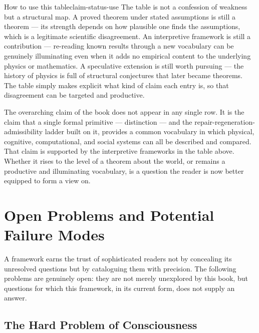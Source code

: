\documentclass[12pt,twoside,openright]{book}
\begin{document}
\begin{remark}{How to use this table}{claim-status-use}
  The table is not a confession of weakness but a
  structural map. A proved theorem under stated assumptions
  is still a theorem --- its strength depends on how
  plausible one finds the assumptions, which is a
  legitimate scientific disagreement. An interpretive
  framework is still a contribution --- re-reading known
  results through a new vocabulary can be genuinely
  illuminating even when it adds no empirical content
  to the underlying physics or mathematics. A speculative
  extension is still worth pursuing --- the history of
  physics is full of structural conjectures that later
  became theorems. The table simply makes explicit what
  kind of claim each entry is, so that disagreement can
  be targeted and productive.

  The overarching claim of the book does not appear in
  any single row. It is the claim that a single formal
  primitive --- distinction --- and the repair-regeneration-
  admissibility ladder built on it, provides a common
  vocabulary in which physical, cognitive, computational,
  and social systems can all be described and compared.
  That claim is supported by the interpretive frameworks
  in the table above. Whether it rises to the level of a
  theorem about the world, or remains a productive and
  illuminating vocabulary, is a question the reader is
  now better equipped to form a view on.
\end{remark}

\chapter{Open Problems and Potential Failure Modes}
\label{app:open-problems}

A framework earns the trust of sophisticated readers not
by concealing its unresolved questions but by cataloguing
them with precision. The following problems are genuinely
open: they are not merely unexplored by this book, but
questions for which this framework, in its current form,
does not supply an answer.

\section{The Hard Problem of Consciousness}
\end{document}
